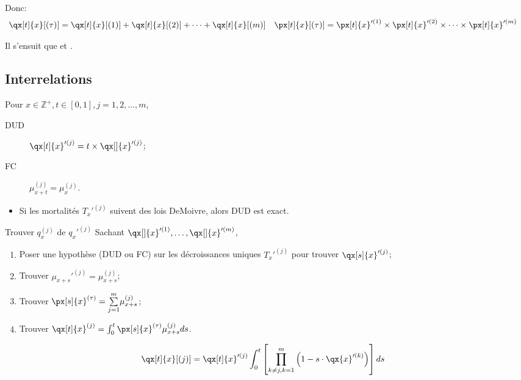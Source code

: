 \documentclass[10pt, french]{article}
\begin{document}
\begin{multicols*}{2}
Donc:
\begin{align*}
	\qx[t]{x}[(\tau)]
	&=	\qx[t]{x}[(1)]	+	\qx[t]{x}[(2)]	+	\dots	+	\qx[t]{x}[(m	)]	&
	\px[t]{x}[(\tau)]
	&=	\px[t]{x}'^{(1)}	\times	\px[t]{x}'^{(2)}	\times	\dots	\times	\px[t]{x}'^{(m)}
\end{align*}

Il s'ensuit que  et .

\subsection*{Interrelations}
\begin{rappel_enhanced}[Hypothèses]
Pour $x \in \mathbb{Z}^{+}, t \in [0, 1], j = 1, 2, \dots, m$,
\begin{description}
	\item[DUD]	$\qx[t]{x}'^{(j)} = t \times \qx[]{x}'^{(j)}$;
	\item[FC]	$\mu_{x + t}^{(j)} = \mu_{x}^{(j)}$.
\end{description}

\begin{itemize}[leftmargin = *]
	\item	Si les mortalités $T_{x}'^{(j)}$ suivent des lois DeMoivre, alors DUD est exact.
\end{itemize}
\end{rappel_enhanced}

\begin{conceptgen}{Trouver $q_{x}^{(j)}$ de $q_{x}'^{(j)}$}
Sachant $\qx[]{x}'^{(1)}, \dots, \qx[]{x}'^{(m)}$,
\begin{enumerate}
	\item	Poser une hypothèse (DUD ou FC) sur les décroissances uniques $T_{x}'^{(j)}$ pour trouver $\qx[s]{x}'^{(j)}$;
	\item	Trouver $\mu_{x + s}'^{(j)}	=	\mu_{x + s}^{(j)}$;
	\item	Trouver $\px[s]{x}^{(\tau)}	=	\sumz{m}{j = 1}\mu_{x + s}^{(j)}$;
	\item	Trouver $\qx[t]{x}^{(j)}	=	\int_{0}^{t}\px[s]{x}^{(\tau)}\mu_{x + s}^{(j)}ds$.
\end{enumerate}

\begin{distributions}
\begin{align*}
	\qx[t]{x}[(j)]
	&=	\qx[t]{x}'^{(j)}	\int_{0}^{t} \left[ \underset{k \neq j, k = 1}{\overset{m}{\prod}}\left(1 - s \cdot \qx{x}'^{(k)}\right) \right] ds
\end{align*}


\end{distributions}
\end{conceptgen}
\end{multicols*}
\end{document}
